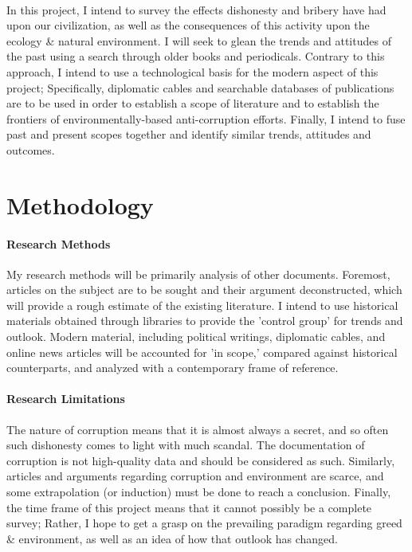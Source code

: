 \documentclass[11pt]{article}
\begin{document}
\paragraph*{} In this project, I intend to survey the effects dishonesty and bribery have had upon our civilization, as well as the consequences of this activity upon the ecology \& natural environment. I will seek to glean the trends and attitudes of the past using a search through older books and periodicals. Contrary to this approach, I intend to use a technological basis for the modern aspect of this project; Specifically, diplomatic cables and searchable databases of publications are to be used in order to establish a scope of literature and to establish the frontiers of environmentally-based anti-corruption efforts. Finally, I intend to fuse past and present scopes together and identify similar trends, attitudes and outcomes.

\section*{Methodology}
\paragraph*{Research Methods}
 My research methods will be primarily analysis of other documents. Foremost, articles on the subject are to be sought and their argument deconstructed, which will provide a rough estimate of the existing literature. I intend to use historical materials obtained through libraries to provide the 'control group' for trends and outlook. Modern material, including political writings, diplomatic cables, and online news articles will be accounted for 'in scope,' compared against historical counterparts, and analyzed with a contemporary frame of reference. 
\paragraph*{Research Limitations}
 The nature of corruption means that it is almost always a secret, and so often such dishonesty comes to light with much scandal. The documentation of corruption is not high-quality data and should be considered as such. Similarly, articles and arguments regarding corruption and environment are scarce, and some extrapolation (or induction) must be done to reach a conclusion. Finally, the time frame of this project means that it cannot possibly be a complete survey; Rather, I hope to get a grasp on the prevailing paradigm regarding greed \& environment, as well as an idea of how that outlook has changed.
\end{document}

